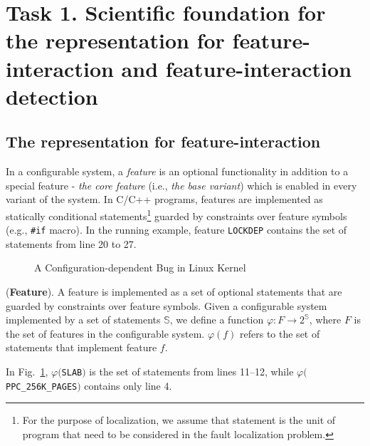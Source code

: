 \section{Task 1. Scientific foundation for the representation for feature-interaction and feature-interaction detection}
\label{task1-section}

\subsection{The representation for feature-interaction}
In a configurable system, a \textit{feature} is an optional
functionality in addition to a special feature - \textit{the core
feature} (i.e., \textit{the base variant}) which is enabled in 
every variant of the system. In C/C++ programs, features are 
implemented as statically conditional statements\footnote{For 
the purpose of localization, we assume that statement is the unit 
of program that need to be considered in the fault localization 
problem.} guarded by constraints over feature symbols (e.g., 
\texttt{\#if} macro). In the running example, feature \texttt{LOCKDEP}
contains the set of statements from line 20 to 27.

\begin{figure}[!h]
\begin{center}

\caption{A Configuration-dependent Bug in Linux Kernel}
\label{example_bug}
\end{center}
\end{figure}

\begin{Definition}{({\bf Feature}).}
A feature is implemented as a set of optional statements that are 
guarded by constraints over feature symbols. Given a configurable 
system implemented by a set of statements $\mathbb{S}$, we define a function 
$\varphi: F\to 2^{\mathbb{S}}$, where $F$ is the set of features in the 
configurable system. $\varphi(f)$ refers to the set of statements 
that implement feature $f$.
\end{Definition}

In Fig.~\ref{example_bug}, $\varphi($\texttt{SLAB}$)$ is the set of
statements from lines 11--12, while
$\varphi($\texttt{PPC\_256K\_PAGES}$)$ contains only line 4.

